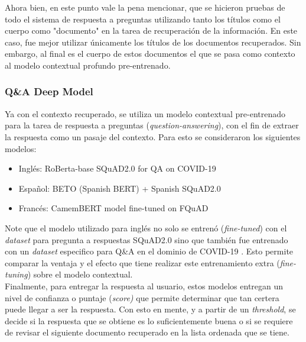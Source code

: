 Ahora bien, en este punto vale la pena mencionar, que se hicieron pruebas de todo el sistema de respuesta a preguntas utilizando tanto los títulos como el cuerpo como "documento" en la tarea de recuperación de la información. En este caso, fue mejor utilizar únicamente los títulos de los documentos recuperados. Sin embargo, al final es el cuerpo de estos documentos el que se pasa como contexto al modelo contextual profundo pre-entrenado. \\

\subsubsection{Q\&A Deep Model}

Ya con el contexto recuperado, se utiliza un modelo contextual pre-entrenado para la tarea de respuesta a preguntas (\textit{question-answering}), con el fin de extraer la respuesta como un pasaje del contexto. Para esto se consideraron los siguientes modelos:

\begin{itemize}
    \item Inglés: RoBerta-base SQuAD2.0 for QA on COVID-19
    
    \item Español: BETO (Spanish BERT) + Spanish SQuAD2.0
    
    \item Francés: CamemBERT model fine-tuned on FQuAD
\end{itemize}

Note que el modelo utilizado para inglés no solo se entrenó (\textit{fine-tuned}) con el \textit{dataset} para pregunta a respuestas SQuAD2.0 sino que también fue entrenado con un \textit{dataset} especifico para Q\&A en el dominio de COVID-19 \cite{moller-etal-2020-covid-qa}. Esto permite comparar la ventaja y el efecto que tiene realizar este entrenamiento extra (\textit{fine-tuning}) sobre el modelo contextual. \\ 

Finalmente, para entregar la respuesta al usuario, estos modelos entregan un nivel de confianza o puntaje (\textit{score)} que permite determinar que tan certera puede llegar a ser la respuesta. Con esto en mente, y a partir de un \textit{threshold}, se decide si la respuesta que se obtiene es lo suficientemente buena o si se requiere de revisar el siguiente documento recuperado en la lista ordenada que se tiene.

